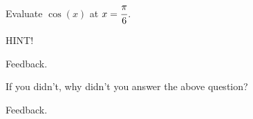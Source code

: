 \documentclass{ximera}
\begin{document}
\begin{problem} 

\begin{problem}
    Evaluate $\cos(x)$ at $x = \cfrac{\pi}{6}$.
    
    \begin{hint}
    HINT!
    \end{hint}

  \begin{multipleChoice}
      \choice{$\pi$}
      \choice{$2\pi$}
      
      \begin{feedback}[attempt]
          Feedback.
      \end{feedback}
      
  \end{multipleChoice}
  
\end{problem}

\begin{question}
  
    If you didn't, why didn't you answer the above question?
  
  \begin{multipleChoice}
      
      \begin{feedback}[attempt]
      Feedback.
      \end{feedback}
  \end{multipleChoice}
  
\end{question}

\end{problem}
\end{document}
